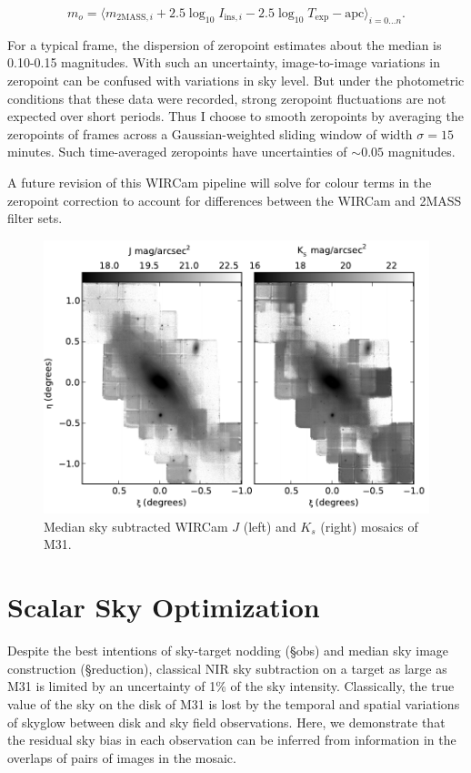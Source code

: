 \documentclass[iop]{emulateapj}
\begin{document}
\begin{equation}
    m_o = \langle m_{\text{2MASS},i} +2.5\log_{10}I_{\text{ins},i} - 2.5 \log_{10} T_\text{exp} - \text{apc} \rangle_{i=0\ldots n}.
\end{equation}

For a typical frame, the dispersion of zeropoint estimates about the median is 0.10-0.15 magnitudes. With such an uncertainty, image-to-image variations in zeropoint can be confused with variations in sky level. But under the photometric conditions that these data were recorded, strong zeropoint fluctuations are not expected over short periods. Thus I choose to smooth zeropoints by averaging the zeropoints of frames across a Gaussian-weighted sliding window of width $\sigma=15$ minutes. Such time-averaged zeropoints have uncertainties of $\sim 0.05$ magnitudes.

A future revision of this WIRCam pipeline will solve for colour terms in the zeropoint correction to account for differences between the WIRCam and 2MASS filter sets.

\begin{figure}[t]
	\centering
		\includegraphics[width=6in]{figs/raw_mosaics}
	\caption{Median sky subtracted WIRCam $J$ (left) and $K_s$ (right) mosaics of M31.}
	\label{fig:raw_mosaics}
\end{figure}

\section{Scalar Sky Optimization}
\label{sec:scalar}

Despite the best intentions of sky-target nodding (\S obs) and median sky image construction (\S reduction), classical NIR sky subtraction on a target as large as M31 is limited by an uncertainty of 1\% of the sky intensity. Classically, the true value of the sky on the disk of M31 is lost by the temporal and spatial variations of skyglow between disk and sky field observations. Here, we demonstrate that the residual sky bias in each observation can be inferred from information in the overlaps of pairs of images in the mosaic.
\end{document}
